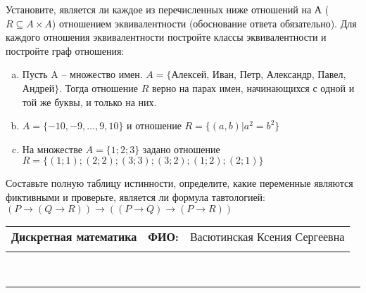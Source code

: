 \documentclass[10pt]{exam}
\newcommand{\class}{Дискретная математика}
\newcommand{\examdate}{}
\begin{document}
\begin{questions}
\question
Установите, является ли каждое из перечисленных ниже отношений на А ($R \subseteq A \times A$) отношением эквивалентности (обоснование ответа обязательно). Для каждого отношения эквивалентности постройте классы 
эквивалентности и постройте граф отношения:
\begin{enumerate} [a)]\setcounter{enumi}{0}
\item Пусть A – множество имен. $A = \{ $Алексей, Иван, Петр, Александр, Павел, Андрей$ \}$. Тогда отношение $R$ верно на парах имен, начинающихся с одной и той же буквы, и только на них.
\item $A = \{-10, -9, … , 9, 10\}$ и отношение $ R = \{(a,b)|a^{2} = b^{2}\}$
\item На множестве $A = \{1; 2; 3\}$ задано отношение $R = \{(1; 1); (2; 2); (3; 3); (3; 2); (1; 2); (2; 1)\}$
\end{enumerate}\question Составьте полную таблицу истинности, определите, какие переменные являются фиктивными и проверьте, является ли формула тавтологией:
$(P \rightarrow (Q \rightarrow R)) \rightarrow ((P \rightarrow Q) \rightarrow (P \rightarrow R))$

\end{questions}
\newpage
\begin{flushright}
\begin{tabular}{p{2.8in} r l}
\textbf{\class} & \textbf{ФИО:} &Васютинская Ксения Сергеевна
\\

\textbf{\examdate} &&\\
\end{tabular}\\
\end{flushright}
\rule[1ex]{\textwidth}{.1pt}
\end{document}
